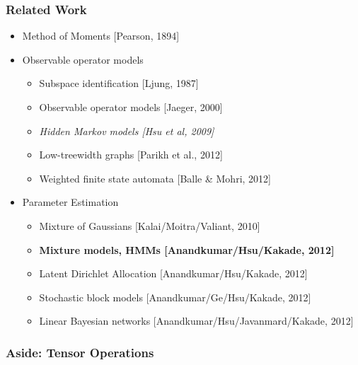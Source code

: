 \documentclass[xcolor={svgnames}]{beamer}
\begin{document}
\begin{frame}
  \frametitle{Related Work}
  \begin{itemize}
    \item<+-> Method of Moments [Pearson, 1894]
    \item<+-> Observable operator models
    \begin{itemize}
      \item Subspace identification [Ljung, 1987]
      \item Observable operator models [Jaeger, 2000]
      \item {\em Hidden Markov models [Hsu et al, 2009]}
      \item Low-treewidth graphs [Parikh et al., 2012]
      \item Weighted finite state automata [Balle \& Mohri, 2012]
    \end{itemize}
     \item<+-> Parameter Estimation
  \begin{itemize}
    \item Mixture of Gaussians [Kalai/Moitra/Valiant, 2010]
    \item {\bf Mixture models, HMMs [Anandkumar/Hsu/Kakade, 2012]}
    \item Latent Dirichlet Allocation [Anandkumar/Hsu/Kakade, 2012]
    \item Stochastic block models [Anandkumar/Ge/Hsu/Kakade, 2012]
    \item Linear Bayesian networks [Anandkumar/Hsu/Javanmard/Kakade, 2012]
  \end{itemize}
  \end{itemize}
\end{frame}

\begin{frame}
  \frametitle{Aside: Tensor Operations}

\end{frame}
\end{document}
